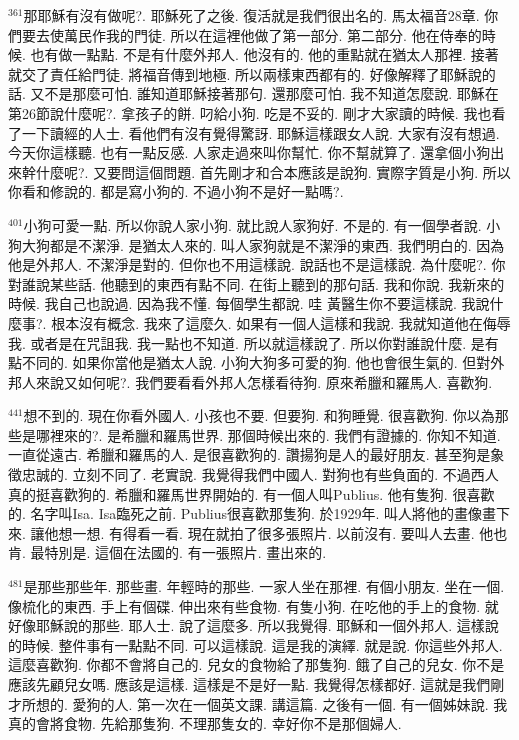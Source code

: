 \documentclass{book}
\begin{document}
$^{361}$那耶穌有沒有做呢?.
耶穌死了之後.
復活就是我們很出名的.
馬太福音28章.
你們要去使萬民作我的門徒.
所以在這裡他做了第一部分.
第二部分.
他在侍奉的時候.
也有做一點點.
不是有什麼外邦人.
他沒有的.
他的重點就在猶太人那裡.
接著就交了責任給門徒.
將福音傳到地極.
所以兩樣東西都有的.
好像解釋了耶穌說的話.
又不是那麼可怕.
誰知道耶穌接著那句.
還那麼可怕.
我不知道怎麼說.
耶穌在第26節說什麼呢?.
拿孩子的餅.
叼給小狗.
吃是不妥的.
剛才大家讀的時候.
我也看了一下讀經的人士.
看他們有沒有覺得驚訝.
耶穌這樣跟女人說.
大家有沒有想過.
今天你這樣聽.
也有一點反感.
人家走過來叫你幫忙.
你不幫就算了.
還拿個小狗出來幹什麼呢?.
又要問這個問題.
首先剛才和合本應該是說狗.
實際字質是小狗.
所以你看和修說的.
都是寫小狗的.
不過小狗不是好一點嗎?.

$^{401}$小狗可愛一點.
所以你說人家小狗.
就比說人家狗好.
不是的.
有一個學者說.
小狗大狗都是不潔淨.
是猶太人來的.
叫人家狗就是不潔淨的東西.
我們明白的.
因為他是外邦人.
不潔淨是對的.
但你也不用這樣說.
說話也不是這樣說.
為什麼呢?.
你對誰說某些話.
他聽到的東西有點不同.
在街上聽到的那句話.
我和你說.
我新來的時候.
我自己也說過.
因為我不懂.
每個學生都說.
哇 黃醫生你不要這樣說.
我說什麼事?.
根本沒有概念.
我來了這麼久.
如果有一個人這樣和我說.
我就知道他在侮辱我.
或者是在咒詛我.
我一點也不知道.
所以就這樣說了.
所以你對誰說什麼.
是有點不同的.
如果你當他是猶太人說.
小狗大狗多可愛的狗.
他也會很生氣的.
但對外邦人來說又如何呢?.
我們要看看外邦人怎樣看待狗.
原來希臘和羅馬人.
喜歡狗.

$^{441}$想不到的.
現在你看外國人.
小孩也不要.
但要狗.
和狗睡覺.
很喜歡狗.
你以為那些是哪裡來的?.
是希臘和羅馬世界.
那個時候出來的.
我們有證據的.
你知不知道.
一直從遠古.
希臘和羅馬的人.
是很喜歡狗的.
讚揚狗是人的最好朋友.
甚至狗是象徵忠誠的.
立刻不同了.
老實說.
我覺得我們中國人.
對狗也有些負面的.
不過西人真的挺喜歡狗的.
希臘和羅馬世界開始的.
有一個人叫Publius.
他有隻狗.
很喜歡的.
名字叫Isa.
Isa臨死之前.
Publius很喜歡那隻狗.
於1929年.
叫人將他的畫像畫下來.
讓他想一想.
有得看一看.
現在就拍了很多張照片.
以前沒有.
要叫人去畫.
他也肯.
最特別是.
這個在法國的.
有一張照片.
畫出來的.

$^{481}$是那些那些年.
那些畫.
年輕時的那些.
一家人坐在那裡.
有個小朋友.
坐在一個.
像梳化的東西.
手上有個碟.
伸出來有些食物.
有隻小狗.
在吃他的手上的食物.
就好像耶穌說的那些.
耶人士.
說了這麼多.
所以我覺得.
耶穌和一個外邦人.
這樣說的時候.
整件事有一點點不同.
可以這樣說.
這是我的演繹.
就是說.
你這些外邦人.
這麼喜歡狗.
你都不會將自己的.
兒女的食物給了那隻狗.
餓了自己的兒女.
你不是應該先顧兒女嗎.
應該是這樣.
這樣是不是好一點.
我覺得怎樣都好.
這就是我們剛才所想的.
愛狗的人.
第一次在一個英文課.
講這篇.
之後有一個.
有一個姊妹說.
我真的會將食物.
先給那隻狗.
不理那隻女的.
幸好你不是那個婦人.
\end{document}
